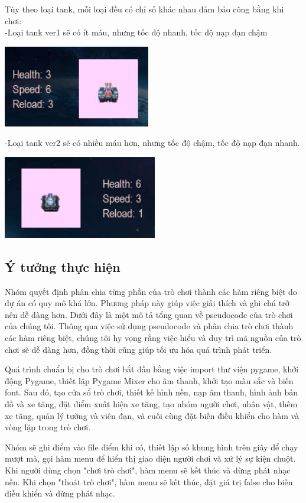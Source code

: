 \documentclass[a4paper]{article}
\begin{document}
Tùy theo loại tank, mỗi loại đều có chỉ số khác nhau đảm bảo công bằng
khi chơi:\\
-Loại tank ver1 sẽ có ít máu, nhưng tốc độ nhanh, tốc độ nạp đạn chậm

\includegraphics[width=2.52917in,height=1.40555in]{image23.png}

-Loại tank ver2 sẽ có nhiều máu hơn, nhưng tốc độ chậm, tốc độ nạp đạn
nhanh.

\includegraphics[width=2.64444in,height=1.42639in]{image24.png}

\subsection{Ý tưởng thực hiện}
Nhóm quyết định phân chia từng phần của trò chơi thành các hàm riêng
biệt do dự án có quy mô khá lớn. Phương pháp này giúp việc giải thích và
ghi chú trở nên dễ dàng hơn. Dưới đây là một mô tả tổng quan về
pseudocode của trò chơi của chúng tôi. Thông qua việc sử dụng pseudocode
và phân chia trò chơi thành các hàm riêng biệt, chúng tôi hy vọng rằng
việc hiểu và duy trì mã nguồn của trò chơi sẽ dễ dàng hơn, đồng thời
cũng giúp tối ưu hóa quá trình phát triển.

Quá trình chuẩn bị cho trò chơi bắt đầu bằng việc import thư viện
pygame, khởi động Pygame, thiết lập Pygame Mixer cho âm thanh, khởi tạo
màu sắc và biến font. Sau đó, tạo cửa sổ trò chơi, thiết kế hình nền,
nạp âm thanh, hình ảnh bản đồ và xe tăng, đặt điểm xuất hiện xe tăng,
tạo nhóm người chơi, nhân vật, thêm xe tăng, quản lý tường và viên đạn,
và cuối cùng đặt biến điều khiển cho hàm và vòng lặp trong trò chơi.

Nhóm sẽ ghi điểm vào file điểm khi có, thiết lập số khung hình trên giây
để chạy mượt mà, gọi hàm menu để hiển thị giao diện người chơi và xử lý
sự kiện chuột. Khi người dùng chọn "chơi trò chơi", hàm menu sẽ kết thúc
và dừng phát nhạc nền. Khi chọn "thoát trò chơi", hàm menu sẽ kết thúc,
đặt giá trị false cho biến điều khiển và dừng phát nhạc.
\end{document}
